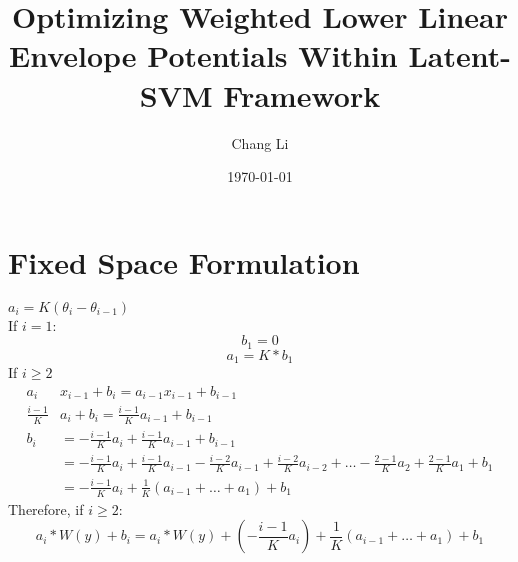 \documentclass{article}
\title{Optimizing Weighted Lower Linear Envelope Potentials Within Latent-SVM Framework}
\author{Chang Li}
\date{\today}
\begin{document}
	\maketitle
	\section{Fixed Space Formulation}
	$a_i=K(\theta_i-\theta_{i-1})$\\
	If $i =1$:
	$$
	b_1 = 0
	$$
	$$
	a_1 = K*b_1
	$$
	If $i \geq 2$
	\begin{align*}
	a_i&x_{i-1}+b_i= a_{i-1}x_{i-1}+b_{i-1}\\
	\frac{i-1}{K}&a_i+b_i=\frac{i-1}{K}a_{i-1}+b_{i-1}\\
	b_i &= -\frac{i-1}{K}a_i+\frac{i-1}{K}a_{i-1}+b_{i-1}\\
	&=-\frac{i-1}{K}a_i+\frac{i-1}{K}a_{i-1}-\frac{i-2}{K}a_{i-1}+\frac{i-2}{K}a_{i-2}+\dots-\frac{2-1}{K}a_2+\frac{2-1}{K}a_1+b_1\\
	&=-\frac{i-1}{K}a_i+\frac{1}{K}(a_{i-1}+\dots+a_1)+b_1
	\end{align*}
	Therefore, if $i \geq 2$:
	$$
	a_i*W(y)+b_i=a_i*W(y)+ (-\frac{i-1}{K}a_i)+\frac{1}{K}(a_{i-1}+\dots+a_1)+b_1
	$$
\end{document}
